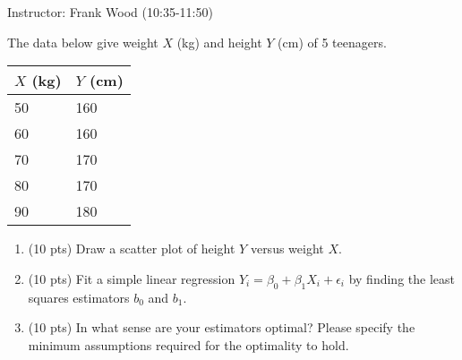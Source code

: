 \documentclass[12pt]{article}
\begin{document}
 \begin{center}
  Instructor: Frank Wood (10:35-11:50) 
 \end{center}
\studentinfo
{}
\finishfirstpage



 {
 The data below give weight $X$ (kg) and height $Y$ (cm)
 of 5 teenagers.

\begin{center}
\begin{tabular}{ll}
$X$ (kg) & $Y$ (cm) \\
\hline
50&160 \\
60&160 \\
70&170 \\
80&170 \\
90&180\\
\hline
\end{tabular}
\end{center}
\begin{enumerate}
\item (10 pts) Draw a scatter plot of height $Y$ versus weight $X$.
\item (10 pts) Fit a simple linear regression $ Y_i=\beta_0+\beta_1 X_i+\epsilon_i$  by finding the least squares estimators $b_0$ and $b_1$.
\item (10 pts) In what sense are your estimators optimal? Please specify the minimum
assumptions required for the optimality to hold.

\end{enumerate}

}
 { \vfill
  \answer
} {  }
\end{document}
